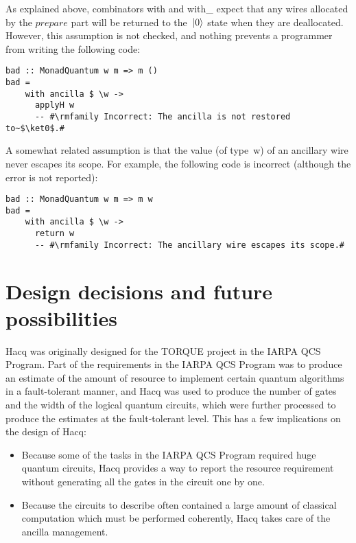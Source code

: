 \documentclass[11pt]{article}
\DeclarePairedDelimiter{\ket}{\lvert}{\rangle}
\newcommand{\var}[1]{\mathit{#1}}
\begin{document}
As explained above, combinators \textsf{with} and \textsf{with\_}
expect that any wires allocated by the $\var{prepare}$ part
will be returned to the~$\ket0$ state when they are deallocated.
However, this assumption is not checked,
and nothing prevents a programmer from writing the following code:
\begin{lstlisting}[frame=single,caption={An incorrect use of combinator \textsf{with}.}]
bad :: MonadQuantum w m => m ()
bad =
    with ancilla $ \w ->
      applyH w
      -- #\rmfamily Incorrect: The ancilla is not restored to~$\ket0$.#
\end{lstlisting}

A somewhat related assumption is that the value (of type~\textsf{w})
of an ancillary wire never escapes its scope.
For example, the following code is incorrect
(although the error is not reported):
\begin{lstlisting}[frame=single,caption={Another incorrect use of combinator \textsf{with}.}]
bad :: MonadQuantum w m => m w
bad =
    with ancilla $ \w ->
      return w
      -- #\rmfamily Incorrect: The ancillary wire escapes its scope.#
\end{lstlisting}

\section{Design decisions and future possibilities}

Hacq was originally designed for the TORQUE project in the IARPA QCS Program.
Part of the requirements in the IARPA QCS Program
was to produce an estimate of the amount of resource
to implement certain quantum algorithms in a fault-tolerant manner,
and Hacq was used to produce the number of gates and the width of the logical quantum circuits,
which were further processed to produce the estimates at the fault-tolerant level.
This has a few implications on the design of Hacq:
\begin{itemize}
\item
  Because some of the tasks in the IARPA QCS Program required huge quantum circuits,
  Hacq provides a way to report the resource requirement
  without generating all the gates in the circuit one by one.
\item
  Because the circuits to describe often contained a large amount
  of classical computation which must be performed coherently,
  Hacq takes care of the ancilla management.
\end{itemize}
\end{document}
